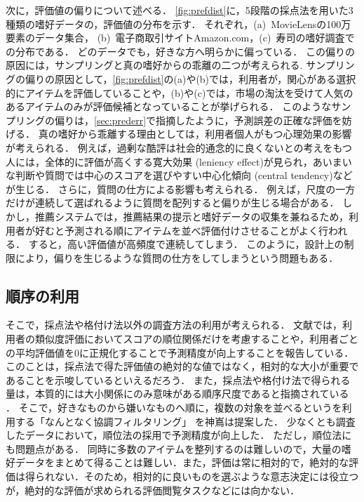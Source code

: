 次に，評価値の偏りについて述べる．
\ref{fig:prefdist}に，5段階の採点法を用いた3種類の嗜好データの，評価値の分布を示す．
それぞれ，(a)~MovieLensの100万要素のデータ集合\cite{url:008}，
(b)~電子商取引サイトAmazon.com\cite{misc:007}，(c)~寿司の嗜好調査\cite{url:020,epublist:064}での分布である．
どのデータでも，好きな方へ明らかに偏っている．
この偏りの原因には，サンプリングと真の嗜好からの乖離の二つが考えられる.
サンプリングの偏りの原因として，\ref{fig:prefdist}の(a)や(b)では，利用者が，関心がある選択的にアイテムを評価していることや，(b)や(c)では，市場の淘汰を受けて人気のあるアイテムのみが評価候補となっていることが挙げられる．
このようなサンプリングの偏りは，\ref{sec:prederr}で指摘したように，予測誤差の正確な評価を妨げる．
真の嗜好から乖離する理由としては，利用者個人がもつ心理効果の影響が考えられる．
例えば，過剰な酷評は社会的通念的に良くないとの考えをもつ人には，全体的に評価が高くする寛大効果 (leniency effect)が見られ，あいまいな判断や質問では中心のスコアを選びやすい中心化傾向 (central tendency)などが生じる\cite{jb:026:00}．
さらに，質問の仕方による影響も考えられる．
例えば，尺度の一方だけが連続して選ばれるように質問を配列すると偏りが生じる場合がある\cite{jb:022:00}．
しかし，推薦システムでは，推薦結果の提示と嗜好データの収集を兼ねるため，利用者が好むと予測される順にアイテムを並べ評価付けさせることがよく行われる．
すると，高い評価値が高頻度で連続してしまう．
このように，設計上の制限により，偏りを生じるような質問の仕方をしてしまうという問題もある．

\subsection{順序の利用}

そこで，採点法や格付け法以外の調査方法の利用が考えられる．
文献\cite{sigir:99:02}では，利用者の類似度評価においてスコアの順位関係だけを考慮することや，利用者ごとの平均評価値を0に正規化することで予測精度が向上することを報告している．
このことは，採点法で得た評価値の絶対的な値ではなく，相対的な大小が重要であることを示唆しているといえるだろう．
また，採点法や格付け法で得られる量は，本質的には大小関係にのみ意味がある順序尺度\cite{eb:036:00,jj:015}であると指摘されている
\cite{jb:022:00}．
そこで，好きなものから嫌いなものへ順に，複数の対象を並べるというを利用する「なんとなく協調フィルタリング」
\cite{epublist:039,epublist:064}を神嶌は提案した．
少なくとも調査したデータにおいて，順位法の採用で予測精度が向上した．
ただし，順位法にも問題点がある．
同時に多数のアイテムを整列するのは難しいので，大量の嗜好データをまとめて得ることは難しい．また，評価は常に相対的で，絶対的な評価は得られない．そのため，相対的に良いものを選ぶような意志決定には役立つが，絶対的な評価が求められる評価閲覧タスクなどには向かない．

